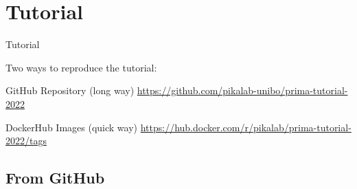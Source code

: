 \documentclass[presentation]{beamer}\mode<presentation>{\usetheme{AMSBolognaFC}}
\begin{document}
\section{Tutorial}

\begin{frame}{Tutorial}

    Two ways to reproduce the tutorial:
    
    \begin{block}{GitHub Repository (long way)}\centering
        \alert{\url{https://github.com/pikalab-unibo/prima-tutorial-2022}}
    \end{block}

    \begin{block}{DockerHub Images (quick way)}\centering
        \alert{\url{https://hub.docker.com/r/pikalab/prima-tutorial-2022/tags}}
    \end{block}
\end{frame}

\subsection{From GitHub}
\end{document}
